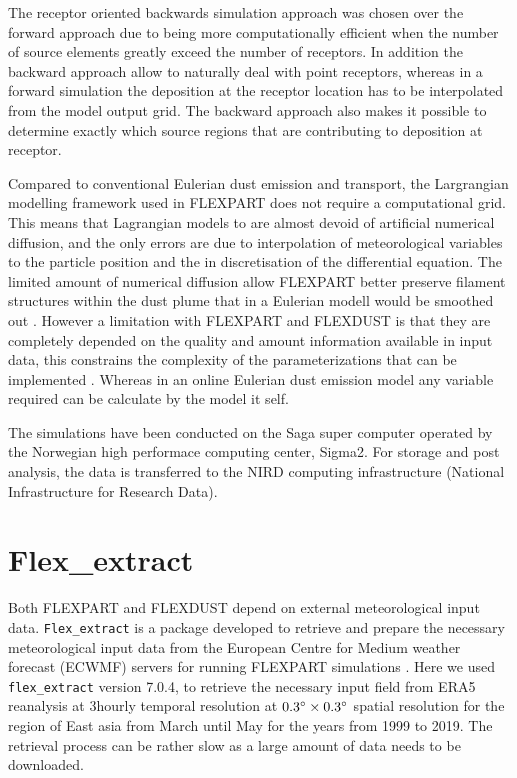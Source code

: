 The receptor oriented backwards simulation approach was chosen over the forward approach due to being more computationally efficient when the number of source elements greatly exceed the number of receptors. In addition the backward approach allow to naturally deal with point receptors, whereas in a forward simulation the deposition at the receptor location has to be interpolated from the model output grid. The backward approach also makes it possible to determine exactly which source regions that are contributing to deposition at receptor.     

Compared to conventional Eulerian dust emission and transport, the Largrangian modelling framework used in FLEXPART does not require a computational grid. This means that Lagrangian models to are almost devoid of artificial numerical diffusion, and the only errors are due to interpolation of meteorological variables to the particle position and the in discretisation of the differential equation. The limited amount of numerical diffusion allow FLEXPART better preserve filament structures within the dust plume that in a Eulerian modell would be smoothed out \parencite{cassiani_offline_2016}. However a limitation with FLEXPART and FLEXDUST is that they are completely depended on the quality and amount information available in input data, this constrains the complexity of the parameterizations that can be implemented \parencite{flexpart_wetdep}. Whereas in an online Eulerian dust emission model any variable required can be calculate by the model it self.       

The simulations have been conducted on the Saga super computer operated by the Norwegian high performace 
computing center, Sigma2. For storage and post analysis, the data is transferred to the 
NIRD computing infrastructure (National Infrastructure for Research Data). 


\section{Flex\_extract}
Both FLEXPART and FLEXDUST depend on external meteorological input data. \verb|Flex_extract| is a package developed to retrieve and prepare the necessary meteorological input data from the European Centre for Medium weather forecast (ECWMF) servers for running FLEXPART simulations \parencite{tipka_flex_extract_2020}. Here we used \verb|flex_extract| version 7.0.4, to retrieve the necessary input field from ERA5 reanalysis at 3hourly temporal resolution at $0.3\degree \times 0.3\degree$ spatial resolution for the region of East asia from March until May for the years from 1999 to 2019. The retrieval process can be rather slow as a large amount of data needs to be downloaded.     

